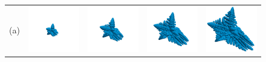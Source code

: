 
\begin{figure}[ht!]
\begin{center}
\begin{tabular}{c c c c c}
(a) &
\includegraphics[width=.2\textwidth]{stefan/nb2_iter19.png} &
\includegraphics[width=.2\textwidth]{stefan/nb2_iter39.png} &
\includegraphics[width=.2\textwidth]{stefan/nb2_iter59.png} &
\includegraphics[width=.2\textwidth]{stefan/nb2_iter79.png}
\end{tabular}


\end{center}
\end{figure}
